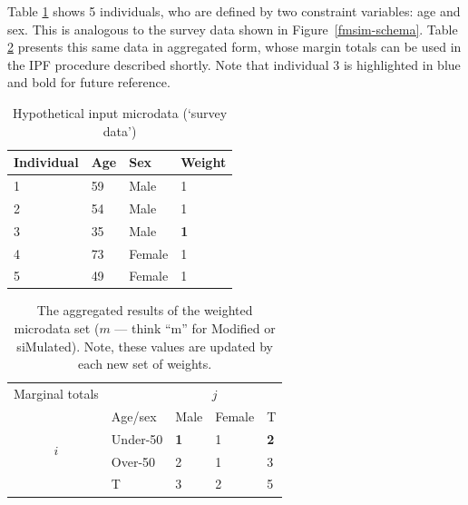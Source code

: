 \documentclass[a4paper, 11pt, twoside]{article}
\begin{document}
Table \ref{t:w} shows 5 individuals, who are defined by two constraint variables:
age and sex. This is analogous to the survey data shown in Figure~\ref{fmsim-schema}.
Table \ref{t:m} presents this same data in aggregated form, whose margin totals can
be used in the IPF procedure described shortly. Note that individual 3 is highlighted in
blue and bold for future reference.

\begin{table}[h]
\caption{Hypothetical input microdata (`survey data')
}
\label{t:w}
\begin{center}
 \begin{tabular}{llll}
\toprule
{Individual } & {Age} & {Sex}  & {Weight} \\
\midrule
1 & 59 & Male  & 1 \\
2 & 54 & Male & 1 \\
3 & {35} & {Male} & \textbf{\color{blue}1} \\
4 & 73 & Female & 1 \\
5 & 49 & Female & 1 \\
\bottomrule
\end{tabular}
\end{center}
\end{table}

\begin{table}[htbp]
\centering
\caption[The aggregated results of the weighted
microdata set]{The aggregated results of the weighted
microdata set ($m$ --- think ``m'' for Modified or siMulated).
Note, these values are updated by each new set of weights.
}

\begin{tabular}{cllll}\toprule
Marginal totals&  & \multicolumn{2}{c}{$j$} & \\
& Age/sex & Male & Female & T\\ \midrule
\multirow{2}{*}{$i$} & Under-50 & \textbf{\color{blue}1} & 1 & \textbf{\color{blue}2}\\
& Over-50 & 2 & 1 &3 \\
& T & 3 & 2 &5\\
\bottomrule
\end{tabular}
\label{t:m}
\end{table}
\end{document}
